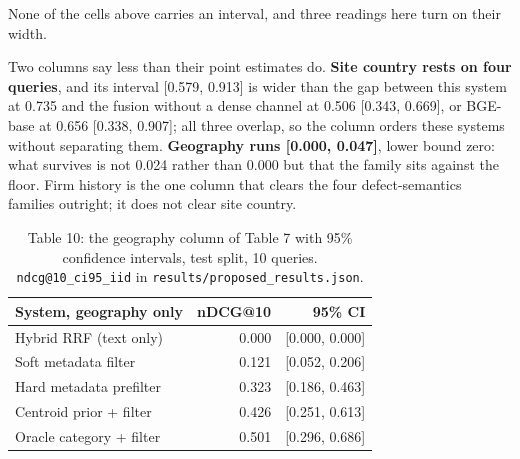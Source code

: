 \documentclass[acmsmall]{acmart}
\begin{document}
None of the cells above carries an interval, and three readings here turn on their width.


\begin{table}[t]
\centering
\small
\caption{Table 9: nDCG@10 with 95\% confidence intervals for the strongest text-only system, test split. IID bootstrap over queries, \texttt{ndcg@10\_ci95\_iid} in \texttt{results/retrieval\_\allowbreak{}results.json}.}
\end{table}

Two columns say less than their point estimates do. \textbf{Site country rests on four queries}, and its interval [0.579, 0.913] is wider than the gap between this system at 0.735 and the fusion without a dense channel at 0.506 [0.343, 0.669], or BGE-base at 0.656 [0.338, 0.907]; all three overlap, so the column orders these systems without separating them. \textbf{Geography runs [0.000, 0.047]}, lower bound zero: what survives is not 0.024 rather than 0.000 but that the family sits against the floor. Firm history is the one column that clears the four defect-semantics families outright; it does not clear site country.


\begin{table}[t]
\centering
\small
\caption{Table 10: the geography column of Table 7 with 95\% confidence intervals, test split, 10 queries. \texttt{ndcg@10\_ci95\_iid} in \texttt{results/proposed\_\allowbreak{}results.json}.}
\begin{tabular}{lrr}
\toprule
System, geography only & nDCG@10 & 95\% CI \\
\midrule
Hybrid RRF (text only) & 0.000 & [0.000, 0.000] \\
Soft metadata filter & 0.121 & [0.052, 0.206] \\
Hard metadata prefilter & 0.323 & [0.186, 0.463] \\
Centroid prior + filter & 0.426 & [0.251, 0.613] \\
Oracle category + filter & 0.501 & [0.296, 0.686] \\
\bottomrule
\end{tabular}
\end{table}
\end{document}
